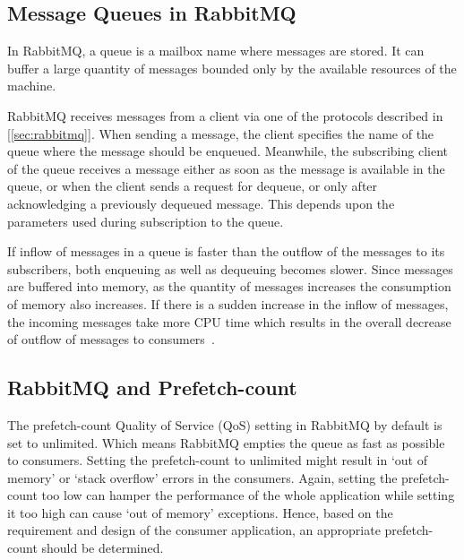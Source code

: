   \subsection{Message Queues in RabbitMQ}
  In RabbitMQ, a queue is a mailbox name where  messages are stored. It can buffer a large quantity of messages bounded only by the available resources of the machine.

  RabbitMQ receives messages from a client via one of the protocols described in [\autoref{sec:rabbitmq}]. When sending a message, the client specifies the name of the queue where the message should be enqueued. Meanwhile, the subscribing client of the queue receives a message either as soon as the message is available in the queue, or when the client sends a request for dequeue, or only after acknowledging a previously dequeued message. This depends upon the parameters used during subscription to the queue.

  If inflow of messages in a queue is faster than the outflow of the messages to its subscribers, both enqueuing as well as dequeuing becomes slower. Since messages are buffered into memory, as the quantity of messages increases the consumption of memory also increases. If there is a sudden increase in the inflow of messages, the incoming messages take more CPU time which results in the overall decrease of outflow of messages to consumers~\cite{sizingYourRabbits}.

  \subsection{RabbitMQ and Prefetch-count}
  \label{subsec:rabbitmqPrefetch}
  The prefetch-count Quality of Service (QoS) setting in RabbitMQ by default is set to unlimited. Which means RabbitMQ empties the queue as fast as possible to consumers. Setting the prefetch-count to unlimited might result in ‘out of memory’ or ‘stack overflow’ errors in the consumers. Again, setting the prefetch-count too low can hamper the performance of the whole application while setting it too high can cause  ‘out of memory’ exceptions. Hence, based on the requirement and design of the consumer application, an appropriate prefetch-count should be determined.

